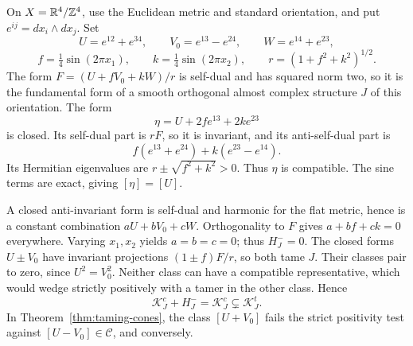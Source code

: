 \begin{example}\label{ex:strict-cones}
On \(X=\mathbb R^4/\mathbb Z^4\), use the Euclidean metric and standard
orientation, and put \(e^{ij}=dx_i\wedge dx_j\). Set
\[
 U=e^{12}+e^{34},\qquad V_0=e^{13}-e^{24},\qquad
 W=e^{14}+e^{23},
\]
\[
 f=\tfrac14\sin(2\pi x_1),\qquad
 k=\tfrac14\sin(2\pi x_2),\qquad
 r=(1+f^2+k^2)^{1/2}.
\]
The form \(F=(U+fV_0+kW)/r\) is self-dual and has squared norm
two, so it is the fundamental form of a smooth orthogonal almost
complex structure \(J\) of this orientation. The form
\[
 \eta=U+2f e^{13}+2k e^{23}
\]
is closed. Its self-dual part is \(rF\), so it is invariant, and
its anti-self-dual part is
\[
 f(e^{13}+e^{24})+k(e^{23}-e^{14}).
\]
Its Hermitian eigenvalues are \(r\pm\sqrt{f^2+k^2}>0\).
Thus \(\eta\) is compatible. The sine terms are exact, giving
\([\eta]=[U]\).

A closed anti-invariant form is self-dual and harmonic for the flat
metric, hence is a constant combination \(aU+bV_0+cW\).
Orthogonality to \(F\) gives \(a+bf+ck=0\) everywhere. Varying
\(x_1,x_2\) yields \(a=b=c=0\); thus \(H_J^-=0\).
The closed forms \(U\pm V_0\) have invariant projections
\((1\pm f)F/r\), so both tame \(J\). Their classes pair to zero,
since \(U^2=V_0^2\). Neither class can have a compatible
representative, which would wedge strictly positively with a tamer
in the other class. Hence
\[
 \mathcal K_J^c+H_J^-=\mathcal K_J^c
 \subsetneq\mathcal K_J^t.
\]
In Theorem~\ref{thm:taming-cones}, the class \([U+V_0]\) fails
the strict positivity test against \([U-V_0]\in\mathcal C\),
and conversely.
\end{example}
